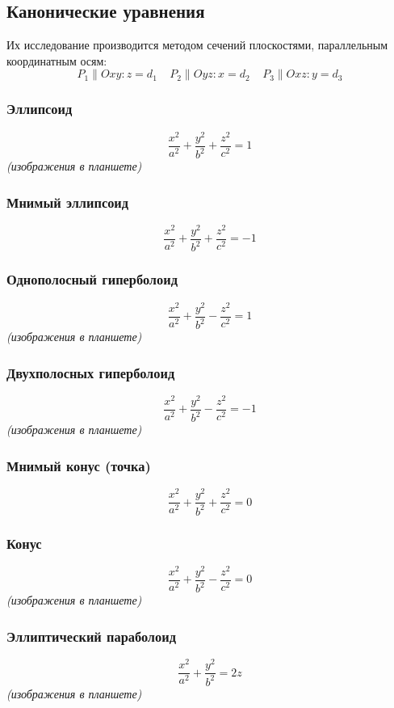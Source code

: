 \documentclass{article}
\begin{document}
\subsection{Канонические уравнения}
Их исследование производится методом сечений плоскостями, параллельным координатным осям:
\[
    P_1 \parallel Oxy: z = d_1 ~~~~~
    P_2 \parallel Oyz: x = d_2 ~~~~~
    P_3 \parallel Oxz: y = d_3
\]

\subsubsection{Эллипсоид}
\[
    \frac{x^2}{a^2} + \frac{y^2}{b^2} + \frac{z^2}{c^2} = 1
\]
\textit{(изображения в планшете)}

\subsubsection{Мнимый эллипсоид}
\[
    \frac{x^2}{a^2} + \frac{y^2}{b^2} + \frac{z^2}{c^2} = -1
\]

\subsubsection{Однополосный гиперболоид}
\[
    \frac{x^2}{a^2} + \frac{y^2}{b^2} - \frac{z^2}{c^2} = 1
\]
\textit{(изображения в планшете)}

\subsubsection{Двухполосных гиперболоид}
\[
    \frac{x^2}{a^2} + \frac{y^2}{b^2} - \frac{z^2}{c^2} = -1
\]
\textit{(изображения в планшете)}

\subsubsection{Мнимый конус (точка)}
\[
    \frac{x^2}{a^2} + \frac{y^2}{b^2} + \frac{z^2}{c^2} = 0
\]

\subsubsection{Конус}
\[
    \frac{x^2}{a^2} + \frac{y^2}{b^2} - \frac{z^2}{c^2} = 0
\]
\textit{(изображения в планшете)}

\subsubsection{Эллиптический параболоид}
\[
    \frac{x^2}{a^2} + \frac{y^2}{b^2} = 2z
\]
\textit{(изображения в планшете)}
\end{document}

